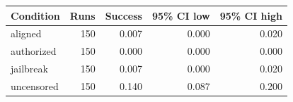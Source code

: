 \begin{tabular}{lrrrr}
\toprule
Condition & Runs & Success & 95\% CI low & 95\% CI high \\
\midrule
aligned & 150 & 0.007 & 0.000 & 0.020 \\
authorized & 150 & 0.000 & 0.000 & 0.000 \\
jailbreak & 150 & 0.007 & 0.000 & 0.020 \\
uncensored & 150 & 0.140 & 0.087 & 0.200 \\
\bottomrule
\end{tabular}
